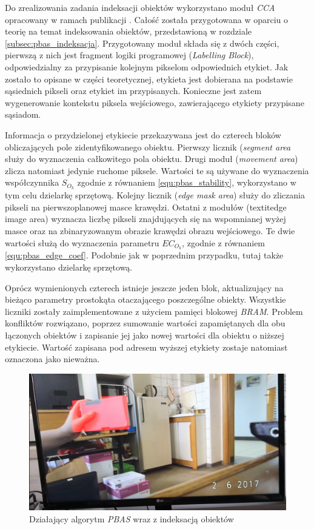 Do zrealizowania zadania indeksacji obiektów wykorzystano moduł \textit{CCA} opracowany w ramach publikacji \cite{kryjak_14_pbas}. Całość została przygotowana w oparciu o teorię na temat indeksowania obiektów, przedstawioną w rozdziale \ref{subsec:pbas_indeksacja}. Przygotowany moduł składa się z dwóch części, pierwszą z nich jest fragment logiki programowej (\textit{Labelling Block}), odpowiedzialny za przypisanie kolejnym pikselom odpowiednich etykiet. Jak zostało to opisane w części teoretycznej, etykieta jest dobierana na podstawie sąsiednich pikseli oraz etykiet im przypisanych. Konieczne jest zatem wygenerowanie kontekstu piksela wejściowego, zawierającego etykiety przypisane sąsiadom.

Informacja o przydzielonej etykiecie przekazywana jest do czterech bloków obliczających pole zidentyfikowanego obiektu. Pierwszy licznik (\textit{segment area} służy do wyznaczenia całkowitego pola obiektu. Drugi moduł (\textit{movement area}) zlicza natomiast jedynie ruchome piksele. Wartości te są używane do wyznaczenia współczynnika $S_{O_k}$ zgodnie z równaniem \ref{equ:pbas_stability}, wykorzystano w tym celu dzielarkę sprzętową. Kolejny licznik (\textit{edge mask area}) służy do zliczania pikseli na pierwszoplanowej masce krawędzi. Ostatni z modułów (textit{edge image area}) wyznacza liczbę pikseli znajdujących się na wspomnianej wyżej masce oraz na zbinaryzowanym obrazie krawędzi obrazu wejściowego. Te dwie wartości służą do wyznaczenia parametru $EC_{O_k}$, zgodnie z równaniem \ref{equ:pbas_edge_coef}. Podobnie jak w poprzednim przypadku, tutaj także wykorzystano dzielarkę sprzętową.

Oprócz wymienionych czterech istnieje jeszcze jeden blok, aktualizujący na bieżąco parametry prostokąta otaczającego poszczególne obiekty. Wszystkie liczniki zostały zaimplementowane z użyciem pamięci blokowej \textit{BRAM}. Problem konfliktów rozwiązano, poprzez sumowanie wartości zapamiętanych dla obu łączonych obiektów i zapisanie jej jako nowej wartości dla obiektu o niższej etykiecie. Wartość zapisana pod adresem wyższej etykiety zostaje natomiast oznaczona jako nieważna.

	\begin{figure}[h!]
		\centering
		\includegraphics[scale=0.2]{img/4/pbas_plus_example.png}
		\caption{Działający algorytm \textit{PBAS} wraz z indeksacją obiektów}
		\label{fig:pbas_plus_demo}
	\end{figure}


